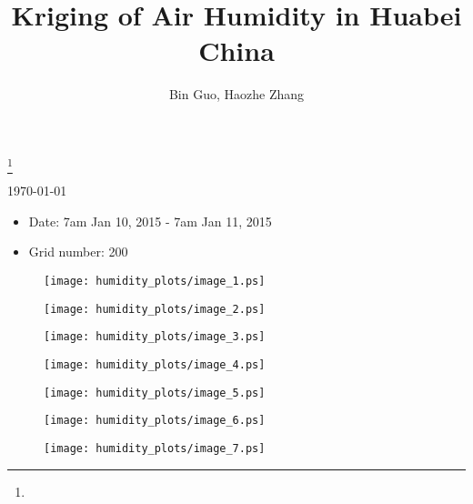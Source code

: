 \documentclass[11pt]{amsart}
\theoremstyle{plain}%
\theoremstyle{definition}
\theoremstyle{remark}
\numberwithin{equation}{thm}
\begin{document}
\title{Kriging of Air Humidity in Huabei China}
\thanks{}
\author[Guo, Zhang]{Bin Guo, Haozhe Zhang}
\today

\maketitle
\begin{itemize}
\item Date: 7am Jan 10, 2015  - 7am Jan 11, 2015
\item Grid number: 200
\end{itemize}


\begin{figure}[H]
\begin{center}
\texttt{[image: humidity\_plots/image\_1.ps]} 
\end{center}
\end{figure}

\begin{figure}[H]
\begin{center}
\texttt{[image: humidity\_plots/image\_2.ps]} 
\end{center}
\end{figure}

\begin{figure}[H]
\begin{center}
\texttt{[image: humidity\_plots/image\_3.ps]} 
\end{center}
\end{figure}

\begin{figure}[H]
\begin{center}
\texttt{[image: humidity\_plots/image\_4.ps]} 
\end{center}
\end{figure}

\begin{figure}[H]
\begin{center}
\texttt{[image: humidity\_plots/image\_5.ps]} 
\end{center}
\end{figure}

\begin{figure}[H]
\begin{center}
\texttt{[image: humidity\_plots/image\_6.ps]} 
\end{center}
\end{figure}

\begin{figure}[H]
\begin{center}
\texttt{[image: humidity\_plots/image\_7.ps]} 
\end{center}
\end{figure}
\end{document}
